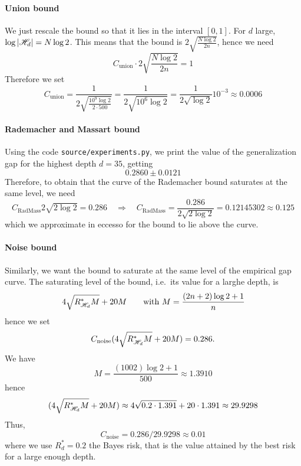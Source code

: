 \documentclass[reqno]{amsart}
\begin{document}
\paragraph{Union bound} We just rescale the bound so that it lies in the interval $[0,1]$. For $d$ large, $\log\vert\mathscr{H}_d\vert = N\log 2$. This means that the bound is $2 \sqrt{\frac{N\log 2}{2n}}$, hence we need
\[
C_\text{union}\cdot 2 \sqrt{\frac{N\log 2}{2n}} = 1
\]
Therefore we set
\[ C_\text{union} = \frac{1}{2 \sqrt{\frac{10^9\log 2}{2\cdot 500}}} = \frac{1}{2 \sqrt{ 10^6\log 2 }} = \frac{1}{2\sqrt{\log 2}}10^{-3} \approx 0.0006
\]


\paragraph{Rademacher and Massart bound} Using the code \texttt{source/experiments.py}, we print the value of the generalization gap for the highest depth $d=35$, getting 
\[
0.2860 \pm 0.0121
\]
Therefore, to obtain that the curve of the Rademacher bound saturates at the same level, we need
\[
C_{\text{RadMass}}2\sqrt{2\log 2} = 0.286 \quad \Rightarrow \quad C_{\text{RadMass}} = \frac{0.286}{2\sqrt{2\log 2}} = 0.12145302 \approx 0.125
\]
which we approximate in eccesso for the bound to lie above the curve. 


\paragraph{Noise bound} Similarly, we want the bound to saturate at the same level of the empirical gap curve. The saturating level of the bound, i.e.\ its value for a larghe depth, is 
\[
4\sqrt{R^*_{\mathscr{H}_d}M} + 20M \qquad \text{with }M = \frac{(2n+2)\log 2+1}{n}
\]
hence we set
\[
C_{\text{noise}} (4\sqrt{R^*_{\mathscr{H}_d}M} + 20M) = 0.286.
\]
We have 
\[
M = \frac{(1002)\log 2+1}{500} \approx 1.3910
\]
hence 
\[
(4\sqrt{R^*_{\mathscr{H}_d}M} + 20M) \approx 4 \sqrt{0.2\cdot 1.391} + 20\cdot 1.391 \approx 29.9298
\]
Thus,
\[
C_{\text{noise}} = 0.286 / 29.9298 \approx 0.01
\]
where we use $R^*_d = 0.2$ the Bayes risk, that is the value attained by the best risk for a large enough depth. 
\end{document}
